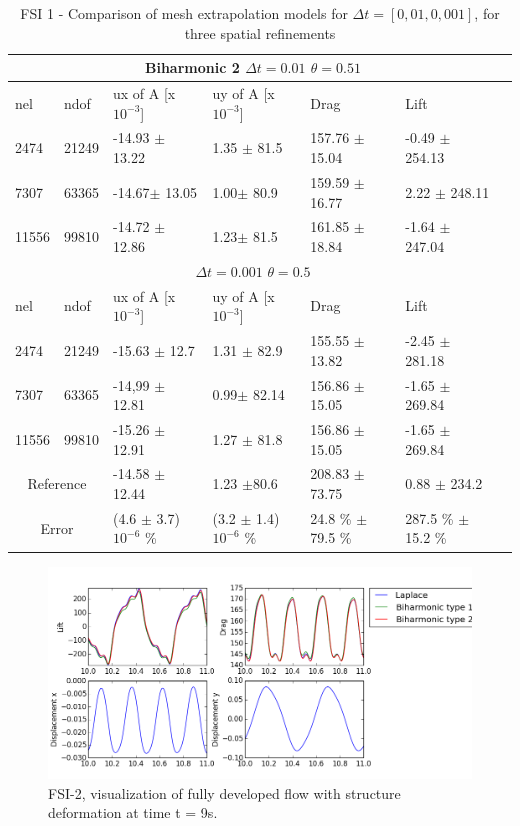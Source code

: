 \begin{table}[h!]
\centering
\label{my-label}
\begin{tabular}{ |p{1cm}||p{1cm}|p{3.2cm}|p{3.2cm}|p{2.9cm}|p{3.1cm}|p{1.2cm}|}
 \hline
  \multicolumn{6}{|c|}{Biharmonic 2 \hspace{2mm}  $\Delta t = 0.01$  \hspace{2mm}  $\theta = 0.51$} \\
   \hline
nel & ndof & ux of A [x $10^{-3}$]  &uy of A [x $10^{-3}$]& Drag  & Lift \\
 \hline
 2474    & 21249  & -14.93 $\pm$ 13.22 & 1.35 $\pm$ 81.5 & 157.76  $\pm$ 15.04 & -0.49  $\pm$  254.13 \\
 7307    & 63365  & -14.67$\pm$ 13.05 & 1.00$\pm$ 80.9& 159.59 $\pm$  16.77 & 2.22 $\pm$  248.11  \\
 11556   & 99810  & -14.72 $\pm$ 12.86 & 1.23$\pm$ 81.5& 161.85   $\pm$18.84 & -1.64  $\pm$  247.04 \\
 \hline
  \multicolumn{6}{|c|}{$\Delta t = 0.001$  \hspace{2mm}  $\theta = 0.5$} \\
   \hline
 nel & ndof & ux of A [x $10^{-3}$]  &uy of A [x $10^{-3}$]& Drag  & Lift \\
\hline
 2474    & 21249  & -15.63  $\pm$ 12.7 & 1.31 $\pm$ 82.9 & 155.55      $\pm$ 13.82 & -2.45   $\pm$ 281.18 \\
 7307    & 63365  &  -14,99 $\pm$ 12.81& 0.99$\pm$ 82.14& 156.86    $\pm$  15.05 & -1.65   $\pm$ 269.84 \\
 11556   & 99810  &  -15.26 $\pm$ 12.91 & 1.27  $\pm$ 81.8 & 156.86   $\pm$ 15.05 & -1.65 $\pm$ 269.84 \\
 \hline
\multicolumn{2}{|c|}{Reference} & -14.58 $\pm$ 12.44   & 1.23 $\pm$80.6    & 208.83 $\pm$ 73.75 & 0.88 $\pm$ 234.2 \\
 \hline
\multicolumn{2}{|c|}{Error}  & (4.6 $\pm$ 3.7)$10^{-6}$ \% & (3.2 $\pm$ 1.4)$10^{-6}$ \%& 24.8 \% $\pm$ 79.5 \% & 287.5 \% $\pm$ 15.2 \% \\
 \hline
\end{tabular}
\caption{FSI 1 - Comparison of mesh extrapolation models for $\Delta t = [0,01, 0,001]$, for three spatial refinements}
\end{table}
\newpage
\begin{figure}[h!]
  \centering
    \includegraphics[scale=0.64]{./Fig/fsi2compare.png}
      \caption{FSI-2, visualization of fully developed flow with structure deformation at time t = 9s.}
\end{figure}
